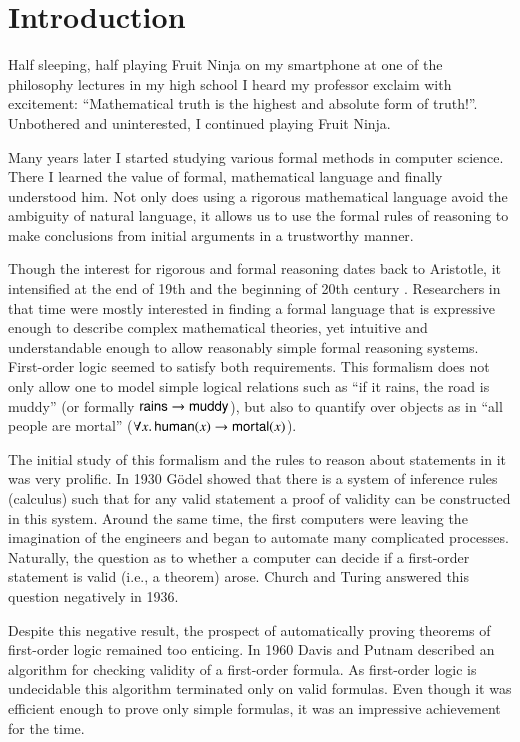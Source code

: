 \chapter{Introduction}
\label{introduction}

Half sleeping, half playing Fruit Ninja on my smartphone at one of the
philosophy lectures in my high school I heard my professor exclaim with
excitement: “Mathematical truth is the highest and absolute form of truth!”.
Unbothered and uninterested, I continued playing Fruit Ninja.

Many years later I started studying various formal methods in computer science.
There I learned the value of formal, mathematical language and finally
understood him. Not only does using a rigorous mathematical language avoid the
ambiguity of natural language, it allows us to use the formal rules of reasoning to
make conclusions from initial arguments in a trustworthy manner. 

Though the interest for rigorous and formal reasoning dates back to Aristotle,
it intensified at the end of 19th and the beginning of 20th century
\cite{jf-01-modern-logic}. Researchers in that time were mostly interested in
finding a formal language that is expressive enough to describe complex
mathematical theories, yet intuitive and understandable enough to allow
reasonably simple formal reasoning systems. First-order logic seemed to satisfy
both requirements.  This formalism does not only allow one to model simple
logical relations such as ``if it rains, the road is muddy'' (or formally
$\mathsf{rains} \rightarrow \mathsf{muddy}$), but also to quantify over objects as in ``all
people are mortal'' ($\forall x.\, \mathsf{human}(x) \rightarrow \mathsf{mortal}(x)$).

The initial study of this formalism and the rules to reason about statements in
it was very prolific. In 1930 G\"odel \cite{kg-30-completeness-theorem} showed
that there is a system of inference rules (calculus) such that for any valid statement a
proof of validity can be constructed in this system. Around the same time, the
first computers were leaving the imagination of the engineers and began to
automate many complicated processes.  Naturally, the question as to  whether a
computer can decide if a first-order statement is valid (i.e., a theorem) arose.
Church \cite{ac-36-fol-undecidable} and Turing \cite{tm-37-undecidable} answered
this question negatively in 1936.

Despite this negative result, the prospect of automatically proving theorems of
first-order logic remained too enticing. In 1960 Davis and Putnam
\cite{dp-1960-dpll} described an algorithm for checking validity of a
first-order formula. As first-order logic is undecidable this algorithm
terminated only on valid formulas. Even though it was efficient enough to prove
only simple formulas, it was an impressive achievement for the time.

